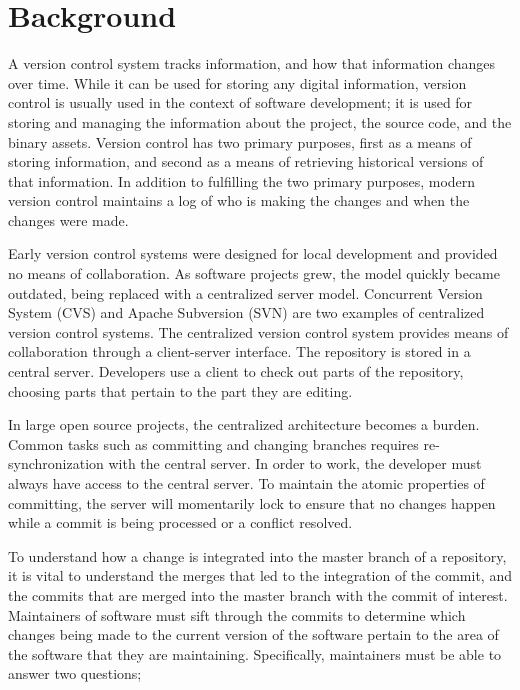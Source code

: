 \chapter{Background}\label{chap:background}

A version control system tracks information, and how that information
changes over time. While it can be used for storing any digital
information, version control is usually used in the context of software
development; it is used for storing and managing the information about
the project, the source code, and the binary assets. Version control has
two primary purposes, first as a means of storing information, and
second as a means of retrieving historical versions of that information.
In addition to fulfilling the two primary purposes, modern version
control maintains a log of who is making the changes and when the
changes were made.

Early version control systems were designed for local development and
provided no means of collaboration. As software projects grew, the model
quickly became outdated, being replaced with a centralized server model.
Concurrent Version System (CVS) and Apache Subversion (SVN) are two
examples of centralized version control systems. The centralized version
control system provides means of collaboration through a client-server
interface. The repository is stored in a central server. Developers use
a client to check out parts of the repository, choosing parts that
pertain to the part they are editing.

In large open source projects, the centralized architecture becomes a
burden. Common tasks such as committing and changing branches requires
re-synchronization with the central server. In order to work, the
developer must always have access to the central server. To maintain the
atomic properties of committing, the server will momentarily lock to
ensure that no changes happen while a commit is being processed or a
conflict resolved.

To understand how a change is integrated into the master branch of a
repository, it is vital to understand the merges that led to the
integration of the commit, and the commits that are merged into the
master branch with the commit of interest. Maintainers of software must
sift through the commits to determine which changes being made to the
current version of the software pertain to the area of the software that
they are maintaining. Specifically, maintainers must be able to answer
two questions;

